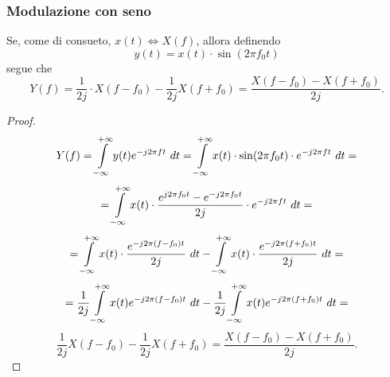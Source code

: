 \documentclass[12pt,oneside,openany]{memoir}
\numberwithin{equation}{subsection}
\newcommand{\dt}{\ dt}
\begin{document}

\newpage
\subsubsection{Modulazione con seno}
Se, come di consueto, $x(t) \iff X(f)$, allora definendo
\[
	y(t) = x(t) \cdot \sin(2 \pi f_0 t)
\]
segue che
\[
	Y(f) = \frac{1}{2j} \cdot X(f - f_0) - \frac{1}{2j} X(f + f_0) =
	\frac{X(f - f_0) - X(f + f_0)}{2j}.
\]
\begin{proof}
\[
	Y(f) = \int\displaylimits_{-\infty}^{+\infty} y(t) e^{-j 2 \pi f t}
	\dt = \int\displaylimits_{-\infty}^{+\infty} x(t) \cdot 
	\sin(2 \pi f_0 t) \cdot e^{-j 2 \pi f t} \dt =
\]
\[
	= \int\displaylimits_{-\infty}^{+\infty} x(t) \cdot
	\frac{e^{j 2 \pi f_0 t} - e^{-j 2 \pi f_0 t}}{2j} \cdot e^{-j 2 \pi f t}
	\dt =
\]
\[
	= \int\displaylimits_{-\infty}^{+\infty} x(t) \cdot
	\frac{e^{-j 2 \pi (f - f_0) t}}{2j} \dt -
	\int\displaylimits_{-\infty}^{+\infty} x(t) \cdot
	\frac{e^{-j 2 \pi (f + f_0) t}}{2j} \dt =
\]
\[
	= \frac{1}{2j} \int\displaylimits_{-\infty}^{+\infty} x(t)
	e^{-j 2 \pi (f - f_0) t} \dt - \frac{1}{2j}
	\int\displaylimits_{-\infty}^{+\infty} x(t) e^{-j 2 \pi (f + f_0) t}
	\dt =
\]
\[
    \frac{1}{2j} X(f - f_0) - \frac{1}{2j} X(f + f_0) =
    \frac{X(f - f_0) - X(f + f_0)}{2j}.
\]
\end{proof}


\newpage
\end{document}
